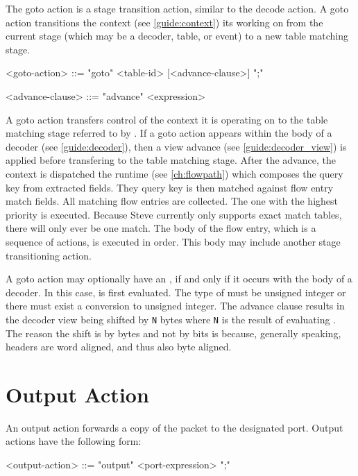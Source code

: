 The goto action is a stage transition action, similar to the decode action. A goto action transitions the context (see \ref{guide:context}) its working on from the current stage (which may be a decoder, table, or event) to a new table matching stage.

\begin{minip}
\begin{grammar}
<goto-action> ::=
"goto" <table-id> [<advance-clause>] ";"

<advance-clause> ::= "advance" <expression>
\end{grammar}
\end{minip}

A goto action transfers control of the context it is operating on to the table matching stage referred to by . If a goto action appears within the body of a decoder (see \ref{guide:decoder}), then a view advance (see \ref{guide:decoder_view}) is applied before transfering to the table matching stage. After the advance, the context is dispatched the runtime (see \ref{ch:flowpath}) which composes the query key from extracted fields. They query key is then matched against flow entry match fields. All matching flow entries are collected. The one with the highest priority is executed. Because Steve currently only supports exact match tables, there will only ever be one match. The body of the flow entry, which is a sequence of actions, is executed in order. This body may include another stage transitioning action.

A goto action may optionally have an , if and only if it occurs with the body of a decoder. In this case,  is first evaluated. The type of  must be unsigned integer or there must exist a conversion to unsigned integer. The advance clause results in the decoder view being shifted by \texttt{N} bytes where \texttt{N} is the result of evaluating . The reason the shift is by bytes and not by bits is because, generally speaking, headers are word aligned, and thus also byte aligned.

\section{Output Action} \label{guide:output}

An output action forwards a copy of the packet to the designated port. Output actions have the following form:

\begin{minip}
\begin{grammar}
<output-action> ::= "output" <port-expression> ";"
\end{grammar}
\end{minip}

